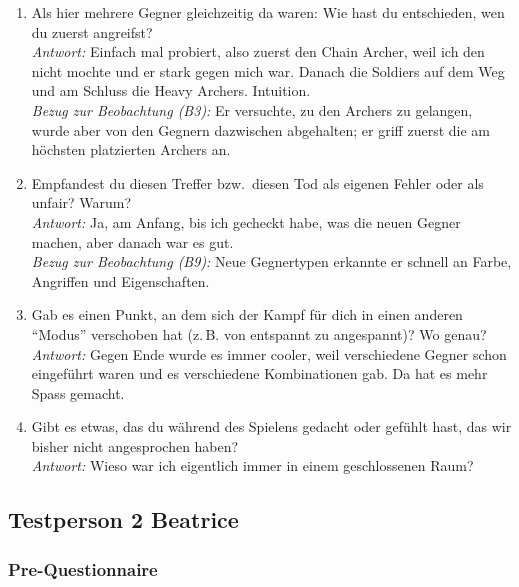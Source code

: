 \documentclass[../Main.tex]{subfiles}
\begin{document}
\begin{enumerate}[label=\textbf{I\arabic*}, leftmargin=1.5cm, itemsep=1em]
\item Als hier mehrere Gegner gleichzeitig da waren: Wie hast du entschieden, wen du zuerst angreifst? \\
    \textit{Antwort:} Einfach mal probiert, also zuerst den Chain Archer, weil ich den nicht mochte und er stark gegen mich war. Danach die Soldiers auf dem Weg und am Schluss die Heavy Archers. Intuition. \\
    \textit{Bezug zur Beobachtung (B3):} Er versuchte, zu den Archers zu gelangen, wurde aber von den Gegnern dazwischen abgehalten; er griff zuerst die am höchsten platzierten Archers an.

\item Empfandest du diesen Treffer bzw.\ diesen Tod als eigenen Fehler oder als unfair? Warum? \\
    \textit{Antwort:} Ja, am Anfang, bis ich gecheckt habe, was die neuen Gegner machen, aber danach war es gut. \\
    \textit{Bezug zur Beobachtung (B9):} Neue Gegnertypen erkannte er schnell an Farbe, Angriffen und Eigenschaften.

\item Gab es einen Punkt, an dem sich der Kampf für dich in einen anderen \enquote{Modus} verschoben hat (z.\,B. von entspannt zu angespannt)? Wo genau? \\
    \textit{Antwort:} Gegen Ende wurde es immer cooler, weil verschiedene Gegner schon eingeführt waren und es verschiedene Kombinationen gab. Da hat es mehr Spass gemacht.

\item Gibt es etwas, das du während des Spielens gedacht oder gefühlt hast, das wir bisher nicht angesprochen haben? \\
    \textit{Antwort:} Wieso war ich eigentlich immer in einem geschlossenen Raum?
\end{enumerate}

\subsection{Testperson 2 Beatrice}

\subsubsection{Pre-Questionnaire}
\end{document}
